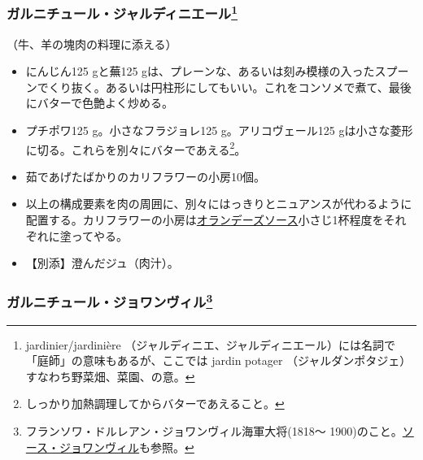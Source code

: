 \begin{recette}
\atoaki{}

\hypertarget{garniture-a-la-jardiniere}{%
\subsubsection[ガルニチュール・ジャルディニエール]{\texorpdfstring{ガルニチュール・ジャルディニエール\footnote{jardinier/jardinière
  （ジャルディニエ、ジャルディニエール）には名詞で「庭師」の意味もあるが、ここでは
  jardin potager （ジャルダンポタジェ）すなわち野菜畑、菜園、の意。}}{ガルニチュール・ジャルディニエール}}\label{garniture-a-la-jardiniere}}



（牛、羊の塊肉の料理に添える）

\begin{itemize}
\item
  にんじん125 gと蕪125
  gは、プレーンな、あるいは刻み模様の入ったスプーンでくり抜く。あるいは円柱形にしてもいい。これをコンソメで煮て、最後にバターで色艶よく炒める。
\item
  プチポワ125 g。小さなフラジョレ125 g。アリコヴェール125
  gは小さな菱形に切る。これらを別々にバターであえる\footnote{しっかり加熱調理してからバターであえること。}。
\item
  茹であげたばかりのカリフラワーの小房10個。
\item
  以上の構成要素を肉の周囲に、別々にはっきりとニュアンスが代わるように配置する。カリフラワーの小房は\protect\hyperlink{sauce-hollandaise}{オランデーズソース}小さじ1杯程度をそれぞれに塗ってやる。
\item
  【別添】澄んだジュ（肉汁）。
\end{itemize}

\atoaki{}

\hypertarget{garniture-joinville}{%
\subsubsection[ガルニチュール・ジョワンヴィル]{\texorpdfstring{ガルニチュール・ジョワンヴィル\footnote{フランソワ・ドルレアン・ジョワンヴィル海軍大将(1818〜
  1900)のこと。\protect\hyperlink{sauce-joinville}{ソース・ジョワンヴィル}も参照。}}{ガルニチュール・ジョワンヴィル}}\label{garniture-joinville}}


\end{recette}
